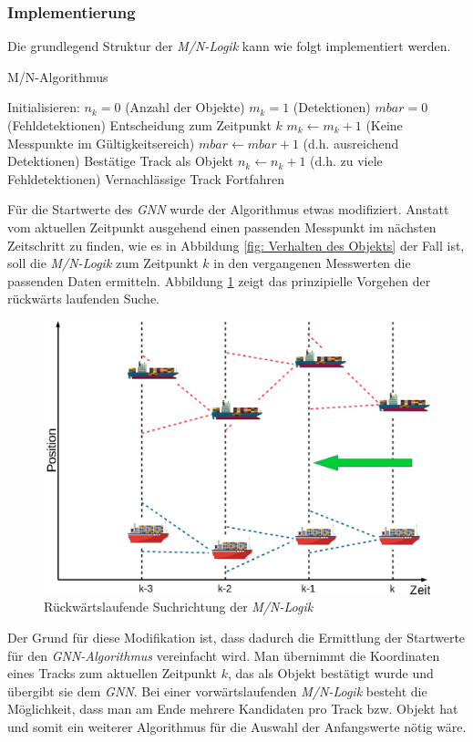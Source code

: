 \documentclass[10pt,a4paper]{article}
\begin{document}
\subsubsection{Implementierung}
	Die grundlegend Struktur der \textit{M/N-Logik} kann wie folgt implementiert werden.
	\begin{algorithm}
	\caption{M/N-Algorithmus}
	\begin{algorithmic}[1]
	\State Initialisieren:
	\State $n_k=0$ (Anzahl der Objekte) 
	\State$m_k=1$ (Detektionen)
	\State$mbar=0$ (Fehldetektionen) 
	\State  Entscheidung zum Zeitpunkt $k$
			\State $m_k\leftarrow m_k+1$			
		\Else{} (Keine Messpunkte im Gültigkeitsereich)
			\State $mbar\leftarrow mbar+1$
		\EndIf
		 (d.h. ausreichend Detektionen)
			\State Bestätige Track als Objekt
			\State $n_k\leftarrow n_k+1$
		 (d.h. zu viele Fehldetektionen)
			\State Vernachlässige Track
		\Else
			\State Fortfahren
		\EndIf		
	\EndFor
	\end{algorithmic}
	\end{algorithm}
	\newline
	Für die Startwerte des \textit{GNN} wurde der Algorithmus etwas modifiziert. Anstatt vom aktuellen Zeitpunkt ausgehend einen passenden Messpunkt im nächsten Zeitschritt zu finden, wie es in Abbildung \ref{fig: Verhalten des Objekts} der Fall ist, soll die \textit{M/N-Logik} zum Zeitpunkt $k$ in den vergangenen Messwerten die passenden Daten ermitteln. Abbildung \ref{fig: Rueckwaertslaufende Suchrichtung der MNLogik} zeigt das prinzipielle Vorgehen der rückwärts laufenden Suche.
	\begin{figure}[h]
	\centering
	\includegraphics[width=0.7\linewidth]{./Pictures_report/Rueckwaertslaufende Suchrichtung der MNLogik.png}
	\caption{Rückwärtslaufende Suchrichtung der \textit{M/N-Logik}}
	\label{fig: Rueckwaertslaufende Suchrichtung der MNLogik}
	\end{figure}	
	Der Grund für diese Modifikation ist, dass dadurch die Ermittlung der Startwerte für den \textit{GNN-Algorithmus} vereinfacht wird. Man übernimmt die Koordinaten eines Tracks zum aktuellen Zeitpunkt $k$, das als Objekt bestätigt wurde und übergibt sie dem \textit{GNN}. Bei einer vorwärtslaufenden \textit{M/N-Logik} besteht die Möglichkeit, dass man am Ende mehrere Kandidaten pro Track bzw. Objekt hat und somit ein weiterer Algorithmus für die Auswahl der Anfangswerte nötig wäre.
\end{document}
